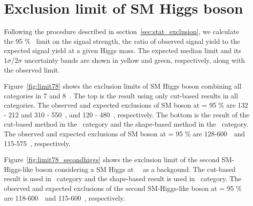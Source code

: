 \section{Exclusion limit of SM Higgs boson}  

Following the procedure described in section~\ref{sec:stat_exclusion}, 
we calculate the 95 \% \CLs\ limit on the signal strength, 
the ratio of observed signal yield to the expected signal yield 
at a given Higgs mass. The expected median limit and its $1\sigma$/$2\sigma$ uncertainty
bands are shown in yellow and green, respectively, along with the observed limit. 

Figure~\ref{fig:limit78} shows the exclusion limits of SM Higgs boson combining 
all categories in 7 and 8~\TeV. 
The top is the result using only cut-based results in all categories. 
The observed and expected exclusions of SM boson at \CLs = 95 \% are 
132 - 212 and 310 - 550~\GeV, and 120 - 480~\GeV, respectively. 
The bottom is the result of the cut-based method in the \SF\ category 
and the shape-based method in the \DF\ category.
The observed and expected exclusions of SM boson at \CLs = 95 \% are 
128-600~\GeV\ and 115-575~\GeV, respectively. 

Figure~\ref{fig:limit78_secondhiggs} shows the exclusion limit of 
the second SM-Higgs-like boson considering a SM Higgs at ~\GeV\ as a backgound.
The cut-based result is used in \SF\ category 
and the shape-based result is used in \DF\ category.
The observed and expected exclusions of the second SM-Higgs-like boson at \CLs = 95 \% 
are 118-600~\GeV\ and 115-600~\GeV, respectively. 

